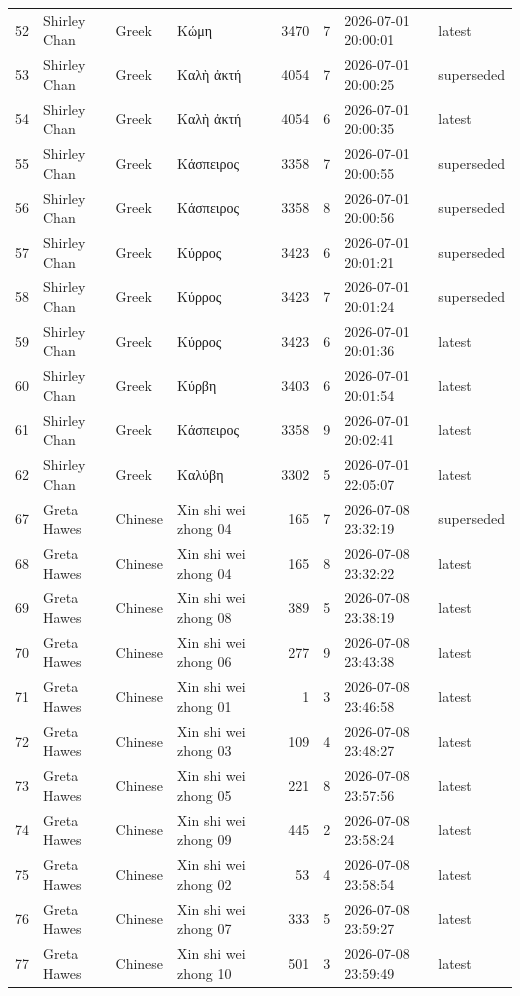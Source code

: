 \begin{longtable}{@{}r l l l r r l l@{}}
52 & Shirley Chan & Greek & Κώμη & 3470 & 7 & 2026-07-01 20:00:01 & latest \\
53 & Shirley Chan & Greek & Καλὴ ἀκτή & 4054 & 7 & 2026-07-01 20:00:25 & superseded \\
54 & Shirley Chan & Greek & Καλὴ ἀκτή & 4054 & 6 & 2026-07-01 20:00:35 & latest \\
55 & Shirley Chan & Greek & Κάσπειρος & 3358 & 7 & 2026-07-01 20:00:55 & superseded \\
56 & Shirley Chan & Greek & Κάσπειρος & 3358 & 8 & 2026-07-01 20:00:56 & superseded \\
57 & Shirley Chan & Greek & Κύρρος & 3423 & 6 & 2026-07-01 20:01:21 & superseded \\
58 & Shirley Chan & Greek & Κύρρος & 3423 & 7 & 2026-07-01 20:01:24 & superseded \\
59 & Shirley Chan & Greek & Κύρρος & 3423 & 6 & 2026-07-01 20:01:36 & latest \\
60 & Shirley Chan & Greek & Κύρβη & 3403 & 6 & 2026-07-01 20:01:54 & latest \\
61 & Shirley Chan & Greek & Κάσπειρος & 3358 & 9 & 2026-07-01 20:02:41 & latest \\
62 & Shirley Chan & Greek & Καλύβη & 3302 & 5 & 2026-07-01 22:05:07 & latest \\
67 & Greta Hawes & Chinese & Xin shi wei zhong 04 & 165 & 7 & 2026-07-08 23:32:19 & superseded \\
68 & Greta Hawes & Chinese & Xin shi wei zhong 04 & 165 & 8 & 2026-07-08 23:32:22 & latest \\
69 & Greta Hawes & Chinese & Xin shi wei zhong 08 & 389 & 5 & 2026-07-08 23:38:19 & latest \\
70 & Greta Hawes & Chinese & Xin shi wei zhong 06 & 277 & 9 & 2026-07-08 23:43:38 & latest \\
71 & Greta Hawes & Chinese & Xin shi wei zhong 01 & 1 & 3 & 2026-07-08 23:46:58 & latest \\
72 & Greta Hawes & Chinese & Xin shi wei zhong 03 & 109 & 4 & 2026-07-08 23:48:27 & latest \\
73 & Greta Hawes & Chinese & Xin shi wei zhong 05 & 221 & 8 & 2026-07-08 23:57:56 & latest \\
74 & Greta Hawes & Chinese & Xin shi wei zhong 09 & 445 & 2 & 2026-07-08 23:58:24 & latest \\
75 & Greta Hawes & Chinese & Xin shi wei zhong 02 & 53 & 4 & 2026-07-08 23:58:54 & latest \\
76 & Greta Hawes & Chinese & Xin shi wei zhong 07 & 333 & 5 & 2026-07-08 23:59:27 & latest \\
77 & Greta Hawes & Chinese & Xin shi wei zhong 10 & 501 & 3 & 2026-07-08 23:59:49 & latest \\
\end{longtable}
